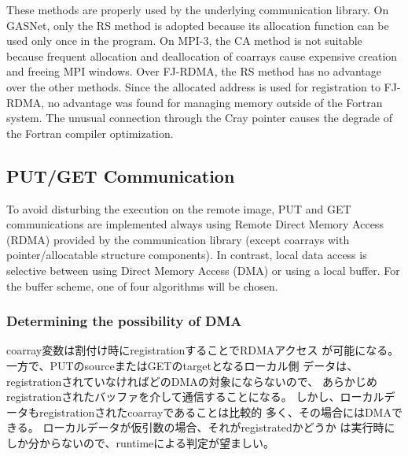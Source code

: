These methods are properly used by the underlying communication library.
%
On GASNet, only the RS method is adopted because its allocation function
can be used only once in the program.
%
On MPI-3, the CA method is not suitable because frequent 
allocation and deallocation of coarrays cause expensive creation and freeing 
MPI windows.
%
Over FJ-RDMA, the RS method has no advantage over the other methods.
Since the allocated address is used for registration to FJ-RDMA, 
no advantage was found for managing memory outside of the Fortran system. 
The unusual connection through the Cray pointer causes the degrade of 
the Fortran compiler optimization.


\subsection{PUT/GET Communication}\label{sec:putget}

To avoid disturbing the execution on the remote image, PUT and GET communications
are implemented always using Remote Direct Memory Access (RDMA) provided by 
the communication library (except coarrays with pointer/allocatable structure components). 
In contrast, local data access is selective between using Direct Memory Access (DMA) or
using a local buffer. For the buffer scheme, one of four algorithms will be chosen.


\subsubsection{Determining the possibility of DMA}\label{sec:opt-dma}

coarray変数は割付け時にregistrationすることでRDMAアクセス
が可能になる。一方で、PUTのsourceまたはGETのtargetとなるローカル側
データは、registrationされていなければどのDMAの対象にならないので、
あらかじめregistrationされたバッファを介して通信することになる。
しかし、ローカルデータもregistrationされたcoarrayであることは比較的
多く、その場合にはDMAできる。
ローカルデータが仮引数の場合、それがregistratedかどうか
は実行時にしか分からないので、runtimeによる判定が望ましい。

